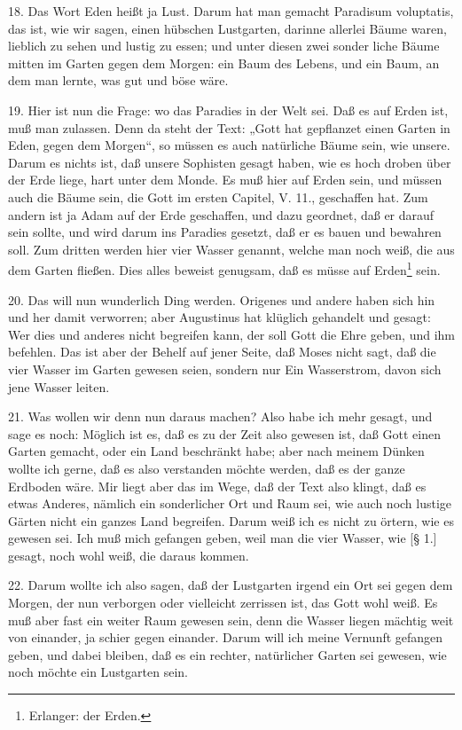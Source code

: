 18. Das Wort Eden heißt ja Lust. Darum hat man gemacht Paradisum voluptatis, das ist, wie wir sagen, einen hübschen Lustgarten, darinne allerlei Bäume waren, lieblich zu sehen und lustig zu essen; und unter diesen zwei sonder
liche Bäume mitten im Garten gegen dem Morgen: ein Baum des Lebens, und ein Baum, an dem man lernte, was gut und böse wäre.

19. Hier ist nun die Frage: wo das Paradies in der Welt sei. Daß es auf Erden ist, muß man zulassen. Denn da steht der Text: „Gott hat gepflanzet einen Garten in Eden, gegen dem Morgen“, so müssen es auch natürliche Bäume sein, wie unsere. Darum es nichts ist, daß unsere Sophisten gesagt haben, wie es hoch droben über der Erde liege, hart unter dem Monde. Es muß hier auf Erden sein, und müssen auch die Bäume sein, die Gott im ersten Capitel, V. 11., geschaffen hat. Zum andern ist ja Adam auf der Erde geschaffen, und dazu geordnet, daß er darauf sein sollte, und wird darum ins Paradies gesetzt, daß er es bauen und bewahren soll. Zum dritten werden hier vier Wasser genannt, welche man noch weiß, die aus dem Garten fließen. Dies alles beweist genugsam, daß es müsse auf Erden\footnote{Erlanger: der Erden.} sein.

20. Das will nun wunderlich Ding werden. Origenes und andere haben sich hin und her damit verworren; aber Augustinus hat klüglich gehandelt und gesagt: Wer dies und anderes nicht begreifen kann, der soll Gott die Ehre geben, und ihm befehlen. Das ist aber der Behelf auf jener Seite, daß Moses nicht sagt, daß die vier Wasser im Garten gewesen seien, sondern nur Ein Wasserstrom, davon sich jene Wasser leiten.

21. Was wollen wir denn nun daraus machen? Also habe ich mehr gesagt, und sage es noch: Möglich ist es, daß es zu der Zeit also gewesen ist, daß Gott einen Garten gemacht, oder ein Land beschränkt habe; aber nach meinem Dünken wollte ich gerne, daß es also verstanden möchte werden, daß es der ganze Erdboden wäre. Mir liegt aber das im Wege, daß der Text also klingt, daß es etwas Anderes, nämlich ein sonderlicher Ort und Raum sei, wie auch noch lustige Gärten nicht ein ganzes Land begreifen. Darum weiß ich es nicht zu örtern, wie es gewesen sei. Ich muß mich gefangen geben, weil man die vier Wasser, wie [§ 1.] gesagt, noch wohl weiß, die daraus kommen.

22. Darum wollte ich also sagen, daß der Lustgarten irgend ein Ort sei gegen dem Morgen, der nun verborgen oder vielleicht zerrissen ist, das Gott wohl weiß. Es muß aber fast ein weiter Raum gewesen sein, denn die Wasser liegen mächtig weit von einander, ja schier gegen einander. Darum will ich meine Vernunft gefangen geben, und dabei bleiben, daß es ein rechter, natürlicher Garten sei gewesen, wie noch möchte ein Lustgarten sein.


